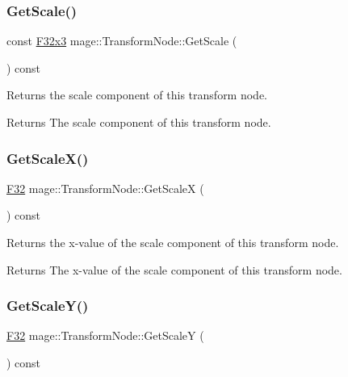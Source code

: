 \subsubsection{\texorpdfstring{Get\+Scale()}{GetScale()}}
{\footnotesize\ttfamily const \hyperlink{namespacemage_a73fbe0da4b8d5bc156bb8453e5b63a17}{F32x3} mage\+::\+Transform\+Node\+::\+Get\+Scale (\begin{DoxyParamCaption}{ }\end{DoxyParamCaption}) const\hspace{0.3cm}{\ttfamily [noexcept]}}

Returns the scale component of this transform node.

\begin{DoxyReturn}{Returns}
The scale component of this transform node. 
\end{DoxyReturn}
\hypertarget{classmage_1_1_transform_node_a7c3e1b4a002bff02c7c5b9d10346a006}{}\label{classmage_1_1_transform_node_a7c3e1b4a002bff02c7c5b9d10346a006} 
\subsubsection{\texorpdfstring{Get\+Scale\+X()}{GetScaleX()}}
{\footnotesize\ttfamily \hyperlink{namespacemage_aa97e833b45f06d60a0a9c4fc22ae02c0}{F32} mage\+::\+Transform\+Node\+::\+Get\+ScaleX (\begin{DoxyParamCaption}{ }\end{DoxyParamCaption}) const\hspace{0.3cm}{\ttfamily [noexcept]}}

Returns the x-\/value of the scale component of this transform node.

\begin{DoxyReturn}{Returns}
The x-\/value of the scale component of this transform node. 
\end{DoxyReturn}
\hypertarget{classmage_1_1_transform_node_a30c5a1f0d549f3d082a04336831c2314}{}\label{classmage_1_1_transform_node_a30c5a1f0d549f3d082a04336831c2314} 
\subsubsection{\texorpdfstring{Get\+Scale\+Y()}{GetScaleY()}}
{\footnotesize\ttfamily \hyperlink{namespacemage_aa97e833b45f06d60a0a9c4fc22ae02c0}{F32} mage\+::\+Transform\+Node\+::\+Get\+ScaleY (\begin{DoxyParamCaption}{ }\end{DoxyParamCaption}) const\hspace{0.3cm}{\ttfamily [noexcept]}}

